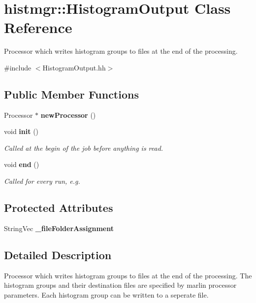 \section{histmgr::HistogramOutput Class Reference}
\label{classhistmgr_1_1HistogramOutput}


Processor which writes histogram groups to files at the end of the processing.  


{\ttfamily \#include $<$HistogramOutput.hh$>$}\subsection*{Public Member Functions}
\begin{DoxyCompactItemize}
\item 
Processor $\ast$ {\bfseries newProcessor} ()\label{classhistmgr_1_1HistogramOutput_aec1ae9dabcace0c5d9c425d4305153aa}

\item 
void {\bf init} ()
\begin{DoxyCompactList}\small\item\em Called at the begin of the job before anything is read. \item\end{DoxyCompactList}\item 
void {\bf end} ()
\begin{DoxyCompactList}\small\item\em Called for every run, e.g. \item\end{DoxyCompactList}\end{DoxyCompactItemize}
\subsection*{Protected Attributes}
\begin{DoxyCompactItemize}
\item 
StringVec {\bfseries \_\-fileFolderAssignment}\label{classhistmgr_1_1HistogramOutput_acf932812a8468eb3106dca6a5b9040ea}

\end{DoxyCompactItemize}


\subsection{Detailed Description}
Processor which writes histogram groups to files at the end of the processing. The histogram groups and their destination files are specified by marlin processor parameters. Each histogram group can be written to a seperate file. 

